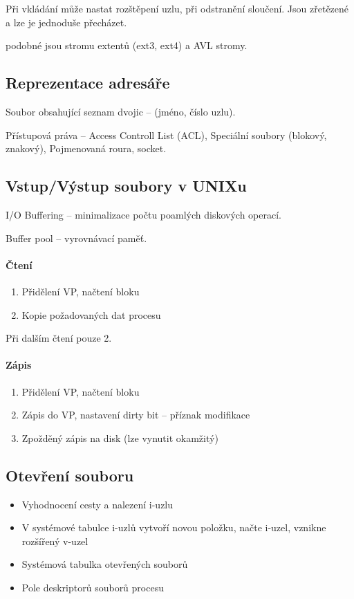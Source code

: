 \documentclass[a4paper, 11pt]{report}
\begin{document}
Při vkládání může nastat rozštěpení uzlu, při odstranění sloučení. Jsou zřetězené a lze je jednoduše přecházet.

podobné jsou stromu extentů (ext3, ext4) a AVL stromy.

\subsection{Reprezentace adresáře}

Soubor obsahující seznam dvojic --  (jméno, číslo uzlu).

Přístupová práva -- Access Controll List (ACL), Speciální soubory (blokový, znakový), Pojmenovaná roura, socket.

\subsection{Vstup/Výstup soubory v UNIXu}

I/O Buffering -- minimalizace počtu poamlých diskových operací.

Buffer pool -- vyrovnávací paměť.

\paragraph{Čtení}
\begin{enumerate}
	\item Přidělení VP, načtení bloku
	\item Kopie požadovaných dat procesu
\end{enumerate}
Při dalším čtení pouze 2.

\paragraph{Zápis}
\begin{enumerate}
	\item Přidělení VP, načtení bloku
	\item Zápis do VP, nastavení dirty bit -- příznak modifikace
	\item Zpožděný zápis na disk (lze vynutit okamžitý)
\end{enumerate}

\subsection{Otevření souboru}

\begin{itemize}
	\item Vyhodnocení cesty a nalezení i-uzlu
	\item V systémové tabulce i-uzlů vytvoří novou položku, načte i-uzel, vznikne rozšířený v-uzel
	\item Systémová tabulka otevřených souborů
	\item Pole deskriptorů souborů procesu
\end{itemize}
\end{document}
